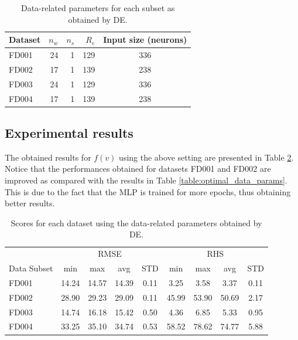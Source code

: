 \documentclass[preprint,12pt]{elsarticle}%
\begin{document}
\begin{table}[!htb]
\begin{center}
\begin{tabular}[c]{l r r r c}\hline
Dataset & $n_{w}$ & $n_{s}$ & $R_{e}$ & Input size (neurons) \\\hline
FD001 & 24 & 1 & 129 & 336\\
FD002 & 17 & 1 & 139 & 238\\
FD003 & 24 & 1 & 129 & 336\\
FD004 & 17 & 1 & 139 & 238\\\hline
\end{tabular}
\caption{Data-related parameters for each subset as obtained by DE.}
\label{table:data_params_de}
\end{center}
\end{table}

\subsection{Experimental results}
\label{sec:experimental_results}

The obtained results for $f(v)$ using the above setting are presented in Table \ref{table:results_ann_de}. Notice that the performances obtained for datasets FD001 and FD002 are improved as compared with the results in Table \ref{table:optimal_data_params}. This is due to the fact that the MLP is trained for more epochs, thus obtaining better results.

\begin{table}[!htb]
\begin{center}
\begin{tabular}[c]{l|cccc|cccc}\hline
& \multicolumn{4}{|c}{RMSE} & \multicolumn{4}{|c}{RHS}\\
Data Subset & min & max & avg & STD & min & max & avg & STD\\\hline
FD001 & 14.24 & 14.57 & 14.39 & 0.11 & 3.25 & 3.58 & 3.37 & 0.11\\
FD002 & 28.90 & 29.23 & 29.09 & 0.11 & 45.99 & 53.90 & 50.69 & 2.17\\
FD003 & 14.74 & 16.18 & 15.42 & 0.50 & 4.36 & 6.85 & 5.33 & 0.95\\
FD004 & 33.25 & 35.10 & 34.74 & 0.53 & 58.52 & 78.62 & 74.77 & 5.88\\\hline
\end{tabular}
\caption{Scores for each dataset using the data-related parameters obtained by DE.}
\label{table:results_ann_de}
\end{center}
\end{table}
\end{document}
